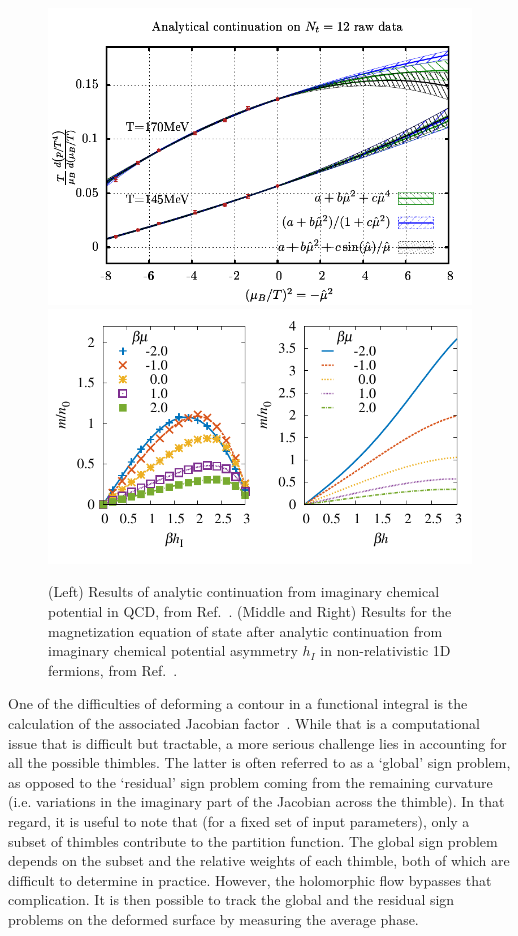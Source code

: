 \documentclass[../main.tex]{subfiles}
\begin{document}
\begin{figure}[t]
  \centering
  \includegraphics[width=0.45 \columnwidth]{./2generalformalism/illustrate_ana_cont.pdf}
  \includegraphics[width=0.52 \columnwidth]{./2generalformalism/Lambda2Magnetization.pdf}
  \caption{\label{fig:ComplexPlaneMethodsResults} (Left) Results of analytic continuation from imaginary chemical potential in QCD, from Ref.~\cite{Gunther:2016vcp}. (Middle and Right) Results for the magnetization equation of state after analytic continuation from imaginary chemical potential asymmetry $h_I$ in non-relativistic 1D fermions, from Ref.~\cite{PhysRevA.92.063609}.}
\end{figure}

One of the difficulties of deforming a contour in a functional integral is the calculation of the associated Jacobian factor~\cite{PhysRevD.93.094514}.
While that is a computational issue that is difficult but tractable, a more serious challenge lies in accounting for all the possible thimbles. The
latter is often referred to as a `global' sign problem, as opposed to the `residual' sign problem coming from the remaining curvature (i.e.
variations in the imaginary part of the Jacobian across the thimble). In that regard, it is useful to note that (for a fixed set of input parameters), only a
subset of thimbles contribute to the partition function. The global sign problem depends on the subset and the relative weights of each thimble,
both of which are difficult to determine in practice. However, the holomorphic flow bypasses that complication. It is then possible to track the global
and the residual sign problems on the deformed surface by measuring the average phase.

\end{document}
